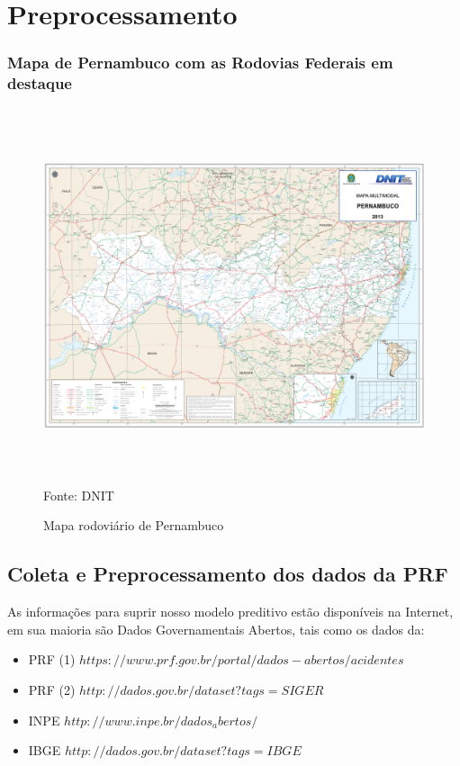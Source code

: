 \chapter{Preprocessamento}\label{pre}


\subsection{Mapa de Pernambuco com as Rodovias Federais em destaque}

\begin{figure}[ht]
	\centering
	\caption{Mapa rodoviário de Pernambuco}
	\includegraphics[width=150mm, height=110mm]{Figuras/Anexos/Mapa-pe.pdf}\\
	\tiny Fonte: DNIT
\end{figure}


\section{Coleta e Preprocessamento dos dados da PRF}\label{intro:Anexo}


As informações para suprir nosso modelo preditivo estão disponíveis na Internet, em sua maioria são Dados Governamentais Abertos, tais como os dados
da:
\begin{itemize}
	\item PRF (1) $ https://www.prf.gov.br/portal/dados-abertos/acidentes $
	\item PRF (2) $ http://dados.gov.br/dataset?tags=SIGER$
	\item INPE $ http://www.inpe.br/dados_abertos/ $ 
	\item IBGE $ http://dados.gov.br/dataset?tags=IBGE $
\end{itemize}

